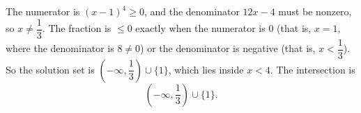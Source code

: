 The numerator is $(x-1)^4\ge0$, and the denominator $12x-4$ must be nonzero, so $x\ne\dfrac13$. The fraction is $\le0$ exactly when the numerator is $0$ (that is, $x=1$, where the denominator is $8\ne0$) or the denominator is negative (that is, $x<\dfrac13$). So the solution set is $\left(-\infty,\dfrac13\right)\cup\{1\}$, which lies inside $x<4$. The intersection is
\[\boxed{\left(-\infty,\dfrac13\right)\cup\{1\}}.\]
